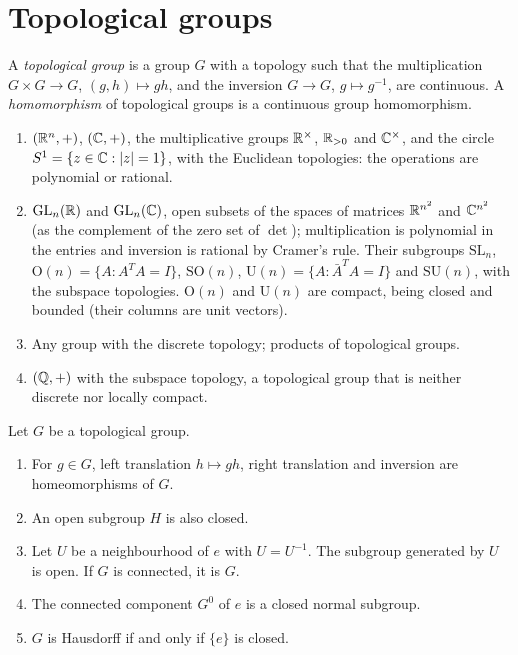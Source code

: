 \section{Topological groups}\label{topological-manifolds:section-groups}

\begin{definition}\label{topological-manifolds:definition-topological-group}
A \emph{topological group} is a group $G$ with a topology such that the multiplication $G \times G \to G$, $(g, h) \mapsto gh$, and the inversion $G \to G$, $g \mapsto g^{-1}$, are continuous. A \emph{homomorphism} of
topological groups is a continuous group homomorphism.
\end{definition}

\begin{example}\label{topological-manifolds:example-topological-groups}
\begin{enumerate}
\item $(\mathbb{R}^n, +)$, $(\mathbb{C}, +)$, the multiplicative groups $\mathbb{R}^\times$, $\mathbb{R}_{>0}$ and $\mathbb{C}^\times$, and the circle $S^1 = \{z \in \mathbb{C} : |z| = 1\}$, with the Euclidean topologies: the operations are polynomial or rational.
\item $\mathrm{GL}_n(\mathbb{R})$ and $\mathrm{GL}_n(\mathbb{C})$, open subsets of the spaces of matrices $\mathbb{R}^{n^2}$ and $\mathbb{C}^{n^2}$ (as the complement of the zero set of $\det$); multiplication is polynomial in the entries and inversion is rational by
Cramer's rule. Their subgroups $\mathrm{SL}_n$, $\mathrm{O}(n) = \{A : A^TA = I\}$, $\mathrm{SO}(n)$, $\mathrm{U}(n) = \{A : \bar A^TA = I\}$ and $\mathrm{SU}(n)$, with the subspace topologies. $\mathrm{O}(n)$ and $\mathrm{U}(n)$ are
compact, being closed and bounded (their columns are unit vectors).
\item Any group with the discrete topology; products of topological groups.
\item $(\mathbb{Q}, +)$ with the subspace topology, a topological group that is neither discrete nor locally compact.
\end{enumerate}
\end{example}

\begin{proposition}\label{topological-manifolds:proposition-topological-groups}
Let $G$ be a topological group.
\begin{enumerate}
\item For $g \in G$, left translation $h \mapsto gh$, right translation and inversion are homeomorphisms of $G$.
\item An open subgroup $H$ is also closed.
\item Let $U$ be a neighbourhood of $e$ with $U = U^{-1}$. The subgroup generated by $U$ is open. If $G$ is connected, it is $G$.
\item The connected component $G^0$ of $e$ is a closed normal subgroup.
\item $G$ is Hausdorff if and only if $\{e\}$ is closed.
\end{enumerate}
\end{proposition}

